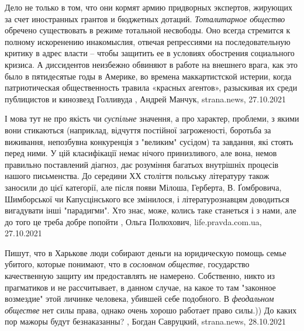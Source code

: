 Дело не только в том, что они кормят армию придворных экспертов, жирующих за
счет иностранных грантов и бюджетных дотаций. \emph{Тоталитарное общество}
обречено существовать в режиме тотальной несвободы. Оно всегда стремится к
полному искоренению инакомыслия, отвечая репрессиями на последовательную
критику в адрес власти – чтобы защитить ее в условиях обострения социального
кризиса.  А диссидентов неизбежно обвиняют в работе на внешнего врага, как это
было в пятидесятые годы в Америке, во времена маккартистской истерии, когда
патриотическая общественность травила «красных агентов», разыскивая их среди
публицистов и кинозвезд Голливуда
, 
Андрей Манчук, strana.news, 27.10.2021

І мова тут не про якість чи \emph{суспільне} значення, а про характер,
проблеми, з якими вони стикаються (наприклад, відчуття постійної загроженості,
боротьба за виживання, непозбувна конкуренція з "великим" сусідом) та завдання,
які стоять перед ними.  У цій класифікації немає нічого принизливого, але вона,
немов правильно поставлений діагноз, дає розуміння багатьох внутрішніх процесів
нашого письменства.  До середини ХХ століття польську літературу також заносили
до цієї категорії, але після появи Мілоша, Герберта, В. Ґомбровича, Шимборської
чи Капусцінського все змінилося, і літературознавцям доводиться вигадувати інші
"парадигми".  Хто знає, може, колись таке станеться і з нами, але до того це
треба добре попойти
, Ольга Полюхович, life.pravda.com.ua, 27.10.2021

Пишут, что в Харькове люди собирают деньги на юридическую помощь семье убитого,
которые понимают, что в \emph{сословном обществе}, государство качественную защиту им
предоставлять не намерено. Собственно, никто из прагматиков и не рассчитывает,
в данном случае, на какое то там "законное возмездие" этой личинке человека,
убившей себе подобного.  В \emph{феодальном обществе} нет силы права, однако очень
хорошо работает право силы.)) До каких пор мажоры будут безнаказанны?
, 
Богдан Савруцкий, strana.news, 28.10.2021
